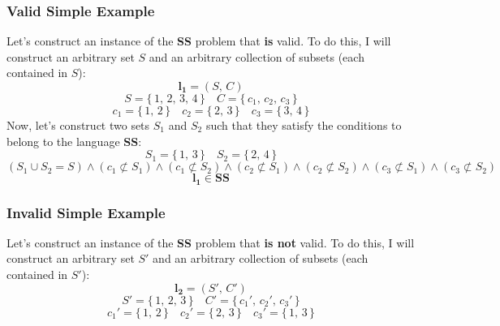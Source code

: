 \documentclass[../main]{subfiles}
\begin{document}
\subsubsection{Valid Simple Example}
Let's construct an instance of the \textbf{SS} problem that \textbf{is} valid. To do this, I will construct an arbitrary set \( S \) and an arbitrary collection of subsets (each contained in \( S \)):
\begin{equation*}
    \textbf{l}_\textbf{1} = ( S, \, C )
\end{equation*}
\begin{equation*}
    S = \{ \, 1, \, 2, \, 3, \, 4 \, \} \quad C = \{ \, c_1, \, c_2, \, c_3 \, \}
\end{equation*}
\begin{equation*}
    c_1 = \{ \, 1, \, 2 \, \} \quad c_2 = \{\, 2, \, 3\, \} \quad c_3 = \{\, 3, \, 4\, \} 
\end{equation*}
Now, let’s construct two sets \( S_1 \) and \( S_2 \) such that they satisfy the conditions to belong to the language \textbf{SS}:
\begin{equation*}
    S_1 = \{ \, 1, \, 3 \, \} \quad S_2 = \{\, 2, \, 4 \, \}
\end{equation*}
\begin{equation*}
    (S_1 \cup S_2 = S) \land (c_1 \not\subset S_1) \land (c_1 \not\subset S_2) \land (c_2 \not\subset S_1) \land (c_2 \not\subset S_2) \land (c_3 \not\subset S_1) \land (c_3 \not\subset S_2)
\end{equation*}
\begin{equation*}
    \textbf{l}_\textbf{1} \in \textbf{SS}
\end{equation*}

\subsubsection{Invalid Simple Example}
Let's construct an instance of the \textbf{SS} problem that \textbf{is not} valid. To do this, I will construct an arbitrary set \( S' \) and an arbitrary collection of subsets (each contained in \( S' \)):
\begin{equation*}
    \textbf{l}_\textbf{2} = ( S', \, C' )
\end{equation*}
\begin{equation*}
    S' = \{ \, 1, \, 2, \, 3 \, \} \quad C' = \{ \, c_1', \, c_2', \, c_3' \, \}
\end{equation*}
\begin{equation*}
    c_1' = \{ \, 1, \, 2 \, \} \quad c_2' = \{\, 2, \, 3\, \} \quad c_3' = \{\, 1, \, 3\, \} 
\end{equation*}
\end{document}

